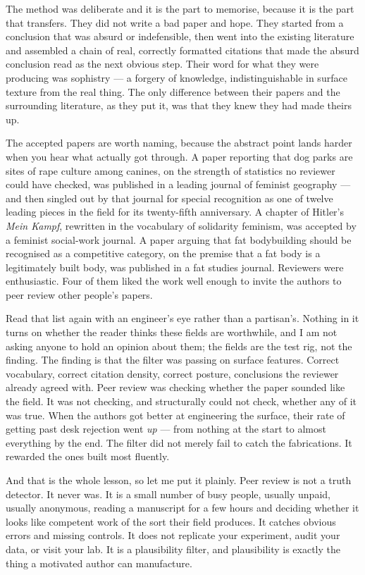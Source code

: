 The method was deliberate and it is the part to memorise, because it is the part that
transfers. They did not write a bad paper and hope. They started from a conclusion that was
absurd or indefensible, then went into the existing literature and assembled a chain of
real, correctly formatted citations that made the absurd conclusion read as the next
obvious step. Their word for what they were producing was sophistry --- a forgery of
knowledge, indistinguishable in surface texture from the real thing. The only difference
between their papers and the surrounding literature, as they put it, was that they knew
they had made theirs up.

The accepted papers are worth naming, because the abstract point lands harder when you
hear what actually got through. A paper reporting that dog parks are sites of rape culture
among canines, on the strength of statistics no reviewer could have checked, was published
in a leading journal of feminist geography --- and then singled out by that journal for
special recognition as one of twelve leading pieces in the field for its twenty-fifth
anniversary. A chapter of Hitler's \emph{Mein Kampf}, rewritten in the vocabulary of
solidarity feminism, was accepted by a feminist social-work journal. A paper arguing that
fat bodybuilding should be recognised as a competitive category, on the premise that a fat
body is a legitimately built body, was published in a fat studies journal. Reviewers were
enthusiastic. Four of them liked the work well enough to invite the authors to peer review
other people's papers.

Read that list again with an engineer's eye rather than a partisan's. Nothing in it turns on
whether the reader thinks these fields are worthwhile, and I am not asking anyone to hold an
opinion about them; the fields are the test rig, not the finding. The finding is that the
filter was passing on surface features. Correct vocabulary, correct citation density, correct
posture, conclusions the reviewer already agreed with. Peer review was checking whether the
paper sounded like the field. It was not checking, and structurally could not check, whether
any of it was true. When the authors got better at engineering the surface, their rate of
getting past desk rejection went \emph{up} --- from nothing at the start to almost everything
by the end. The filter did not merely fail to catch the fabrications. It rewarded the ones
built most fluently.

And that is the whole lesson, so let me put it plainly. Peer review is not a truth
detector. It never was. It is a small number of busy people, usually unpaid, usually
anonymous, reading a manuscript for a few hours and deciding whether it looks like
competent work of the sort their field produces. It catches obvious errors and
missing controls. It does not replicate your experiment, audit your data, or visit
your lab. It is a plausibility filter, and plausibility is exactly the thing a
motivated author can manufacture.

